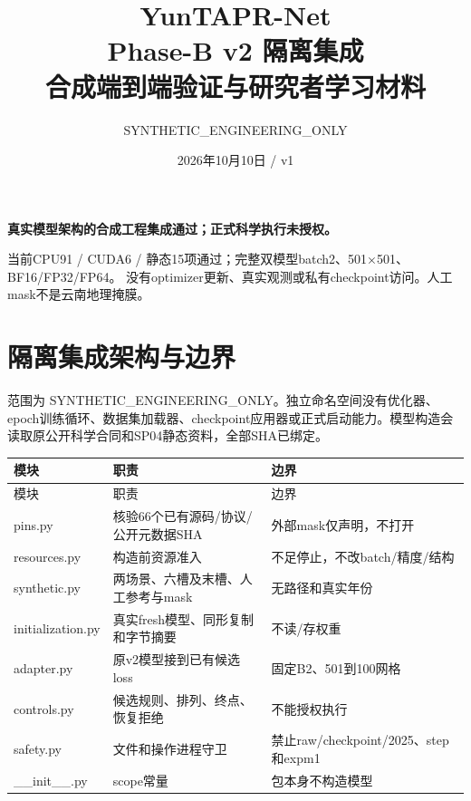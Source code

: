 \documentclass[UTF8,fontset=fandol,10pt]{ctexart}
\title{YunTAPR-Net\\Phase-B v2 隔离集成\\合成端到端验证与研究者学习材料}
\author{SYNTHETIC\_ENGINEERING\_ONLY}\date{2026年10月10日 / v1}
\begin{document}
\maketitle
\textbf{真实模型架构的合成工程集成通过；正式科学执行未授权。}

当前CPU91 / CUDA6 / 静态15项通过；完整双模型batch2、501×501、BF16/FP32/FP64。
没有optimizer更新、真实观测或私有checkpoint访问。人工mask不是云南地理掩膜。
\setcounter{tocdepth}{1}\begingroup\small\setlength{\parskip}{0pt}\tableofcontents\endgroup
\clearpage\section{隔离集成架构与边界}

范围为 SYNTHETIC\_\allowbreak{}ENGINEERING\_\allowbreak{}ONLY。独立命名空间没有优化器、epoch训练循环、数据集加载器、checkpoint应用器或正式启动能力。模型构造会读取原公开科学合同和SP04静态资料，全部SHA已绑定。

\begingroup\small\setlength{\tabcolsep}{3pt}\renewcommand{\arraystretch}{1.12}
\begin{longtable}{>{\raggedright\arraybackslash}p{\dimexpr(\linewidth-6\tabcolsep)/3\relax}>{\raggedright\arraybackslash}p{\dimexpr(\linewidth-6\tabcolsep)/3\relax}>{\raggedright\arraybackslash}p{\dimexpr(\linewidth-6\tabcolsep)/3\relax}}
\toprule
模块 & 职责 & 边界 \\
\midrule\endfirsthead
模块 & 职责 & 边界 \\
\midrule\endhead
pins.py & 核验66个已有源码/\allowbreak{}协议/\allowbreak{}公开元数据SHA & 外部mask仅声明，不打开 \\
resources.py & 构造前资源准入 & 不足停止，不改batch/\allowbreak{}精度/\allowbreak{}结构 \\
synthetic.py & 两场景、六槽及末槽、人工参考与mask & 无路径和真实年份 \\
initialization.py & 真实fresh模型、同形复制和字节摘要 & 不读/\allowbreak{}存权重 \\
adapter.py & 原v2模型接到已有候选loss & 固定B2、501到100网格 \\
controls.py & 候选规则、排列、终点、恢复拒绝 & 不能授权执行 \\
safety.py & 文件和操作进程守卫 & 禁止raw/\allowbreak{}checkpoint/\allowbreak{}2025、step和expm1 \\
\_\allowbreak{}\_\allowbreak{}init\_\allowbreak{}\_\allowbreak{}.py & scope常量 & 包本身不构造模型 \\
\bottomrule\end{longtable}\endgroup
\end{document}
